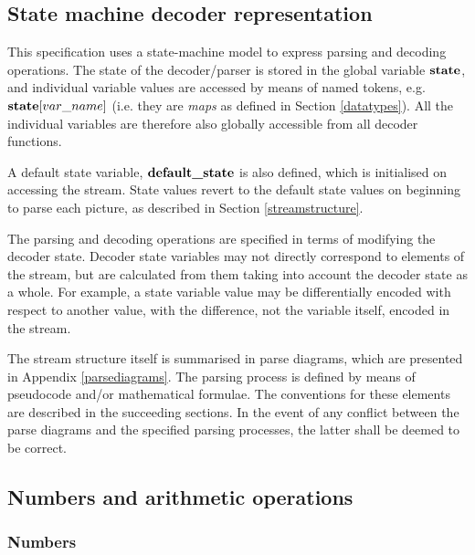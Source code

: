 
\subsection{State machine decoder representation}

This specification uses a state-machine model to express parsing and
decoding operations. The state of the decoder/parser is stored in the
global variable $\textbf{state}$, and individual variable values are accessed
by means of named tokens, e.g. $\textbf{state}[var\_name]$ (i.e. they
are {\em maps} as defined in Section \ref{datatypes}). All the individual
variables are therefore also globally accessible from all decoder functions.

A default state variable, $\textbf{default\_state}$ is also defined, which is
initialised on accessing the stream. State values revert to the default
state values on beginning to parse each picture, as described in 
Section \ref{streamstructure}.

The parsing and decoding operations are specified in terms of modifying
the decoder state. Decoder state variables may not directly correspond
to elements of the stream, but are calculated from them taking into
account the decoder state as a whole. For example, a state variable value 
may be differentially encoded with respect to another value, with the
difference, not the variable itself, encoded in the stream. 

The stream structure itself is summarised in parse diagrams, which 
are presented in Appendix \ref{parsediagrams}. The parsing process
is defined by means of pseudocode and/or mathematical formulae. The
conventions for these elements are described in the succeeding sections.
In the event of any conflict between the parse diagrams and the specified
parsing processes, the latter shall be deemed to be correct.

\subsection{Numbers and arithmetic operations}
\label{mathnotation}

\subsubsection{Numbers}
\label{numbers}

